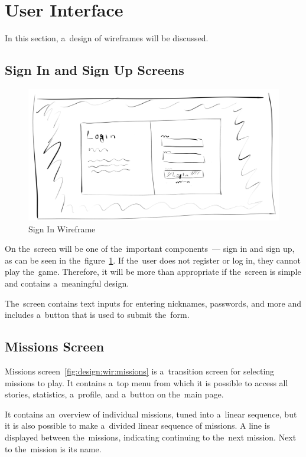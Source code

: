 \section{User Interface}
\label{design:ui}

In this section, a~design of wireframes will be discussed.

\subsection{Sign In and Sign Up Screens}

\begin{figure}
    \centering
    \includegraphics[width=1\linewidth]{assets/design/ui/wir_login.png}
    \caption{Sign In Wireframe}
    \label{fig:design:wir:login}
\end{figure}

On the~screen will be one of the~important components~--- sign in and sign up, as can be seen in the~figure~\ref{fig:design:wir:login}.
If the~user does not register or log in, they cannot play the~game.
Therefore, it will be more than appropriate if the~screen is simple and contains a~meaningful design.

The~screen contains text inputs for entering nicknames, passwords, and more and includes a~button that is used to submit the~form.

\subsection{Missions Screen}

Missions screen~\ref{fig:design:wir:missions} is a~transition screen for selecting missions to play.
It contains a~top menu from which it is possible to access all stories, statistics, a~profile, and a~button on the~main page.

It contains an~overview of individual missions, tuned into a~linear sequence, but it is also possible to make a~divided linear sequence of missions.
A line is displayed between the~missions, indicating continuing to the~next mission.
Next to the~mission is its name.


